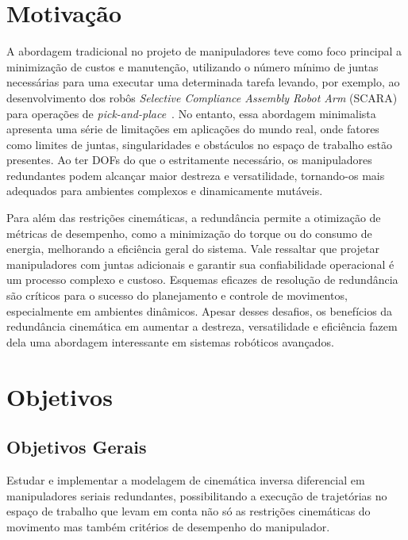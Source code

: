 \section{Motivação}\label{sec:motivation}

A abordagem tradicional no projeto de manipuladores teve como foco principal a minimização de custos e manutenção,
utilizando o número mínimo de juntas necessárias para uma executar uma determinada tarefa levando, por exemplo, ao
desenvolvimento dos robôs \emph{Selective Compliance Assembly Robot Arm} (SCARA) para operações de \emph{pick-and-place}~\cite{siciliano_springer_2008}.
No entanto, essa abordagem  minimalista apresenta uma série de limitações em aplicações do mundo real, onde fatores como
limites de juntas, singularidades e obstáculos no espaço de trabalho estão presentes. Ao ter DOFs
do que o estritamente necessário, os manipuladores redundantes podem alcançar maior destreza e versatilidade, tornando-os
mais adequados para ambientes complexos e dinamicamente mutáveis.

Para além das restrições cinemáticas, a redundância permite a otimização de métricas de desempenho, como a minimização do torque ou do consumo de energia, melhorando a
eficiência geral do sistema. Vale ressaltar que projetar manipuladores com juntas adicionais e garantir sua confiabilidade operacional é um
processo complexo e custoso. Esquemas eficazes de resolução de redundância são críticos para o sucesso do planejamento e controle de movimentos,
especialmente em ambientes dinâmicos. Apesar desses desafios, os benefícios da redundância cinemática em aumentar a destreza, versatilidade e eficiência
fazem dela uma abordagem interessante em sistemas robóticos avançados.

\section{Objetivos}\label{sec:objectives}

\subsection{Objetivos Gerais}

Estudar e implementar a modelagem de cinemática inversa diferencial em manipuladores seriais redundantes, possibilitando a execução de
trajetórias no espaço de trabalho que levam em conta não só as restrições cinemáticas do movimento mas também critérios
de desempenho do manipulador.

